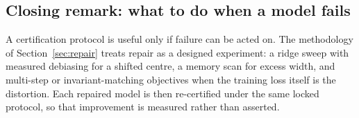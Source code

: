 \documentclass[12pt,a4paper]{article}
\begin{document}
\subsection{Closing remark: what to do when a model fails}

A certification protocol is useful only if failure can be acted on. The
methodology of Section~\ref{sec:repair} treats repair as a designed
experiment: a ridge sweep with measured debiasing for a shifted centre,
a memory scan for excess width, and multi-step or invariant-matching
objectives when the training loss itself is the distortion. Each
repaired model is then re-certified under the same locked protocol, so
that improvement is measured rather
than asserted.

\newpage


\end{document}
